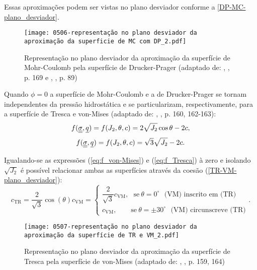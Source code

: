 Essas aproximações podem ser vistas no plano desviador conforme a \autoref{DP-MC-plano_desviador}.
\begin{figure}[H]
	\begin{center}
		\texttt{[image: 0506-representação no plano desviador da aproximação da superficie de MC com DP\_2.pdf]}
	\end{center}
	\caption{\label{DP-MC-plano_desviador}Representação no plano desviador da aproximação da superfície de Mohr-Coulomb pela superfície de Drucker-Prager  (adaptado de: \citeauthor{Neto2008}, \citeyear{Neto2008}, p. 169 e \citeauthor{Bernaud1991}, \citeyear{Bernaud1991}, p. 89)}
\end{figure}
Quando $\phi = 0$ a superfície de Mohr-Coulomb e a de Drucker-Prager se tornam independentes da pressão hidrostática e se particularizam, respectivamente, para a superfície de Tresca e von-Mises (adaptado de: \citeauthor{Neto2008}, \citeyear{Neto2008}, p. 160, 162-163):
\begin{equation}
	\label{eq:f_Tresca}
	f(\underline{\underline \sigma},\underline q) = f(J_2,\theta,c) = 2\sqrt{J_2}\cos{\theta} - 2c,
\end{equation}
\begin{equation}
	\label{eq:f_von-Mises}
	f(\underline{\underline \sigma},\underline q) = f(J_2,\theta,c) = \sqrt{3}\sqrt{J_2} - 2c.
\end{equation}

Igualando-se as expressões (\ref{eq:f_von-Mises}) e (\ref{eq:f_Tresca}) à zero e isolando $\sqrt{J_2}$ é possível relacionar ambas as superfícies através da coesão (\autoref{TR-VM-plano_desviador}):
\begin{equation}
	\label{eq:ctr_cvm}
	c_{\text{TR}} = \dfrac{2}{\sqrt{3}}\cos(\theta)c_{\text{VM}} = \left\{
	\begin{array}{lcl}
		\dfrac{2}{\sqrt{3}}c_{\text{VM}}, ~~~\text{se}~\theta = 0^\circ ~~~ \text{(VM) inscrito em (TR)} \\ 
		c_{\text{VM}},~~~~~~~~~\text{se}~\theta = \pm 30^\circ  ~~~ \text{(VM) circunscreve (TR)}
	\end{array}
	\right..
\end{equation}
\begin{figure}[H]
	\begin{center}
		\texttt{[image: 0507-representação no plano desviador da aproximação da superfície de TR e VM\_2.pdf]}
	\end{center}
	\caption{\label{TR-VM-plano_desviador}Representação no plano desviador da aproximação da superfície de Tresca pela superfície de von-Mises (adaptado de: \citeauthor{Neto2008}, \citeyear{Neto2008}, p. 159, 164)}
\end{figure}

